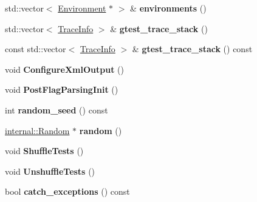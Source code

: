 \begin{DoxyCompactItemize}
std\+::vector$<$ \mbox{\hyperlink{classtesting_1_1_environment}{Environment}} $\ast$ $>$ \& {\bfseries environments} ()
\item 
\mbox{\label{classtesting_1_1internal_1_1_unit_test_impl_af8c7c0a0c954e36d83e6e4690d3fb938}} 
std\+::vector$<$ \mbox{\hyperlink{structtesting_1_1internal_1_1_trace_info}{Trace\+Info}} $>$ \& {\bfseries gtest\+\_\+trace\+\_\+stack} ()
\item 
\mbox{\label{classtesting_1_1internal_1_1_unit_test_impl_ad82fed50f13f13f11867af9dad4a2cf6}} 
const std\+::vector$<$ \mbox{\hyperlink{structtesting_1_1internal_1_1_trace_info}{Trace\+Info}} $>$ \& {\bfseries gtest\+\_\+trace\+\_\+stack} () const
\item 
\mbox{\label{classtesting_1_1internal_1_1_unit_test_impl_a21cd7b2928de03a55b5252f29dd5ae6d}} 
void {\bfseries Configure\+Xml\+Output} ()
\item 
\mbox{\label{classtesting_1_1internal_1_1_unit_test_impl_a772894193104b1b2516f16e6ff813168}} 
void {\bfseries Post\+Flag\+Parsing\+Init} ()
\item 
\mbox{\label{classtesting_1_1internal_1_1_unit_test_impl_a625b9fb6d17b008c44fc902255e6343c}} 
int {\bfseries random\+\_\+seed} () const
\item 
\mbox{\label{classtesting_1_1internal_1_1_unit_test_impl_ab3b45b5eb4d583219a3602011ea44347}} 
\mbox{\hyperlink{classtesting_1_1internal_1_1_random}{internal\+::\+Random}} $\ast$ {\bfseries random} ()
\item 
\mbox{\label{classtesting_1_1internal_1_1_unit_test_impl_aaaa38e6a4372e6bb9bbe3143a3a32b65}} 
void {\bfseries Shuffle\+Tests} ()
\item 
\mbox{\label{classtesting_1_1internal_1_1_unit_test_impl_a1ee7db3bf8284dd9dce4dc857564bce3}} 
void {\bfseries Unshuffle\+Tests} ()
\item 
\mbox{\label{classtesting_1_1internal_1_1_unit_test_impl_aa311b980783a9cfb547831f7b19e3f3a}} 
bool {\bfseries catch\+\_\+exceptions} () const
\end{DoxyCompactItemize}
